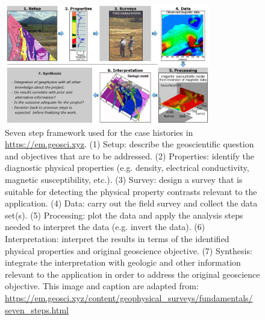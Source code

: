 \begin{figure}
    \begin{center}
    \includegraphics[width=0.8\textwidth]{figures/education/seven_steps.jpg}
    \end{center}
\caption{
   Seven step framework used for the case histories in \href{https://em.geosci.xyz}{https://em.geosci.xyz}.
   (1) Setup: describe the geoscientific question and objectives that are to be addressed.
   (2) Properties: identify the diagnostic physical properties (e.g. density, electrical conductivity, magnetic susceptibility, etc.).
   (3) Survey: design a survey that is suitable for detecting the physical property contrasts relevant to the application.
   (4) Data: carry out the field survey and collect the data set(s).
   (5) Processing: plot the data and apply the analysis steps needed to interpret the data (e.g. invert the data).
   (6) Interpretation: interpret the results in terms of the identified physical properties and original geoscience objective.
   (7) Synthesis: integrate the interpretation with geologic and other information relevant to the application in order to address the original geoscience objective.
   This image and caption are adapted from:
   \href{https://em.geosci.xyz/content/geophysical_surveys/fundamentals/seven_steps.html}{https://em.geosci.xyz/content/geophysical\_surveys/fundamentals/ seven\_steps.html}
}
\label{fig:seven_steps}
\end{figure}



